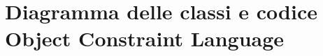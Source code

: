 \section{Diagramma delle classi e codice Object Constraint Language}
\label{secD3:DiagrammaECodiceObjectConstraintLanguage}